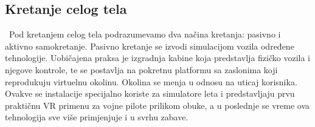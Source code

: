 \documentclass[a4paper]{article}
\begin{document}
\subsection{Kretanje celog tela}
\label{subsec:vizuelna percepcija}
\indent~Pod kretanjem celog tela podrazumevamo dva načina kretanja: pasivno i aktivno samokretanje. Pasivno kretanje se izvodi simulacijom vozila određene tehnologije. Uobičajena praksa je izgradnja kabine koja predstavlja fizičko vozila i njegove kontrole, te se postavlja na pokretnu platformu sa zaslonima koji reprodukuju virtuelnu okolinu. Okolina se menja u odnosu na uticaj korisnika. Ovakve se instalacije specijalno koriste za simulatore leta i predstavljaju prvu praktičnu VR primenu za vojne pilote prilikom obuke, a u poslednje se vreme ova tehnologija sve više primjenjuje i u svrhu zabave.
\end{document}
